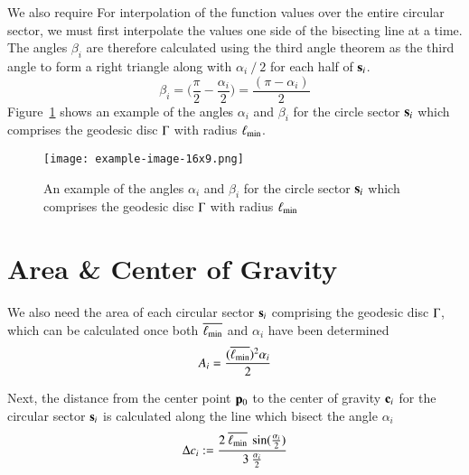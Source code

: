 We also require For interpolation of the function values over the entire circular sector, we must first interpolate the values one side of the bisecting line at a time. The angles $\beta_i$ are therefore calculated using the third angle theorem as the third angle to form a right triangle along with $\alpha_i\mathbin{/}2$ for each half of $\mathbf{s}_i$. 
\begin{equation}
	\beta_i = \Big(\frac{\pi}{2} - \frac{\alpha_i}{2}\Big) = \frac{(\pi - \alpha_i)}{2}
	\label{eq:betaFromHalfAlpha}
\end{equation}%
%
Figure~\ref{fig:angles} shows an example of the angles $\alpha_i$ and $\beta_i$ for the circle sector $\mathbf{s}_i$  which comprises the geodesic disc $\Gamma$ with radius $\ell_\text{min}$.
\begin{figure}[ht]
\ffigbox
	{\texttt{[image: example-image-16x9.png]}}
	{\caption[The angles $\alpha_i$ and $\beta_i$]{An example of the angles $\alpha_i$ and $\beta_i$ for the circle sector $\mathbf{s}_i$  which comprises the geodesic disc $\Gamma$ with radius $\ell_\text{min}$}\label{fig:angles}}
\end{figure}%
%
%
%
%
%
\section{Area \& Center of Gravity}
\label{ch4sACG}
We also need the area of each circular sector $\mathbf{s}_i$ comprising the geodesic disc $\Gamma$, which can be calculated once both $\overline{\ell_\text{min}}$ and $\alpha_i$ have been determined
\begin{equation}
	A_i = \frac{(\overline{\ell_\text{min}})^2\alpha_i}{2}
	\label{eq:circularSectorArea}
\end{equation}
%
%

Next, the distance from the center point $\mathbf{p}_0$ to the center of gravity $\mathbf{c}_i$ for the circular sector $\mathbf{s}_i$ is calculated along the line which bisect the angle $\alpha_i$
\begin{equation}
	\Delta c_i := \frac{2\:\overline{\ell_\text{min}}\:\sin(\frac{\alpha_i}{2})}{3\:\frac{\alpha_i}{2}}
	\label{eq:distToCoG}
\end{equation}
%
%

